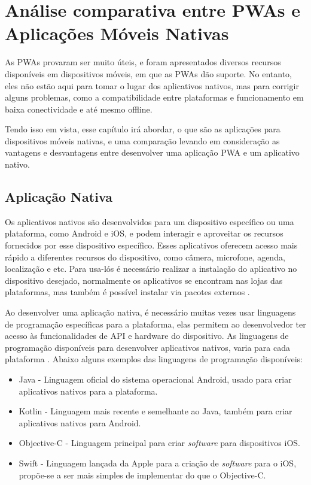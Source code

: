 \chapter{Análise comparativa entre PWAs e Aplicações Móveis Nativas}

As \ac{PWA}s provaram ser muito úteis, e foram apresentados diversos recursos disponíveis em dispositivos móveis, em que as \ac{PWA}s dão suporte. No entanto, eles não estão aqui para tomar o lugar dos aplicativos nativos, mas para corrigir alguns problemas, como a compatibilidade entre plataformas e funcionamento em baixa conectividade e até mesmo offline.

Tendo isso em vista, esse capítulo irá abordar, o que são as aplicações para dispositivos móveis nativas, e uma comparação levando em consideração as vantagens e desvantagens entre desenvolver uma aplicação \ac{PWA} e um aplicativo nativo.

\section{Aplicação Nativa}
Os aplicativos nativos são desenvolvidos para um dispositivo específico ou uma plataforma, como Android e iOS, e podem interagir e aproveitar os recursos fornecidos por esse dispositivo específico. Esses aplicativos oferecem acesso mais rápido a diferentes recursos do dispositivo, como câmera, microfone, agenda, localização e etc.
Para usa-lós é necessário realizar a instalação do aplicativo no dispositivo desejado, normalmente os aplicativos se encontram nas lojas das plataformas, mas também é possível instalar via pacotes externos \cite{native}.

Ao desenvolver uma aplicação nativa, é necessário muitas vezes usar linguagens de programação específicas para a plataforma, elas permitem ao desenvolvedor ter acesso às funcionalidades de \ac{API} e hardware do dispositivo. As linguagens de programação disponíveis para desenvolver aplicativos nativos, varia para cada plataforma \cite{native}. Abaixo alguns exemplos das linguagens de programação disponíveis:

\begin{itemize}
	\item Java - Linguagem oficial do sistema operacional Android, usado para criar aplicativos nativos para a plataforma.
	\item Kotlin - Linguagem mais recente e semelhante ao Java, também para criar aplicativos nativos para Android.
	\item Objective-C - Linguagem principal para criar \textit{software} para dispositivos iOS.
	\item Swift -  Linguagem lançada da Apple para a criação de \textit{software} para o iOS, propõe-se a ser mais simples de implementar do que o Objective-C.
\end{itemize}

